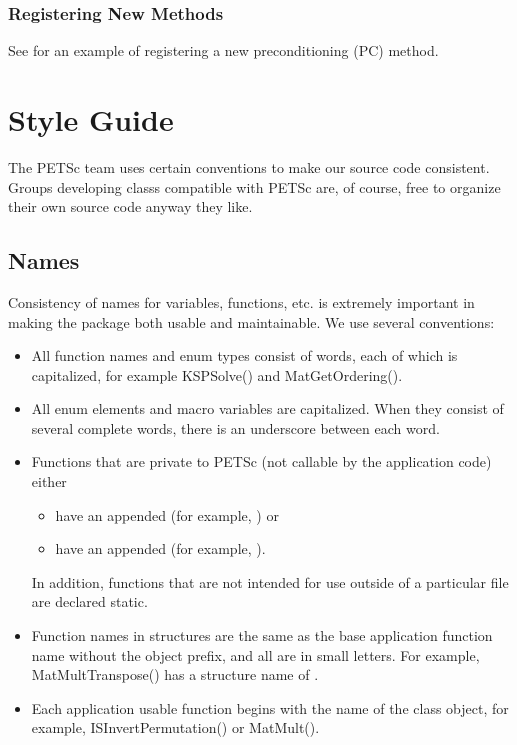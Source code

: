 \documentclass[twoside,12pt]{../sty/report_petsc}
\begin{document}
\subsection{Registering New Methods}
\label{sec:registeringnewmethods}

See  for an example of registering a new
preconditioning (PC) method.


\chapter{Style Guide}

The PETSc team uses certain conventions to make our source code consistent. Groups
developing classs compatible with PETSc are, of course, free to organize their
own source code anyway they like.

\section{Names}
Consistency of names for variables, functions, etc. is extremely 
important in making the package both usable and maintainable.
We use several conventions:
\begin{itemize}
\item All function names and enum types consist of words, each of 
      which is capitalized, for example KSPSolve() and 
      MatGetOrdering().
\item All enum elements and macro variables are capitalized. When
      they consist of several complete words, there is an underscore between each word.
\item Functions that are private to PETSc (not callable by the 
      application code) either
      \begin{itemize}
        \item have an appended  (for example, 
           ) or
        \item have an appended  (for example,
           ).
      \end{itemize}

      In addition, functions that are not intended for use outside
      of a particular file are declared static.
\item Function names in structures are the same as the base application
      function name without the object prefix, and all are in small letters. 
      For example, MatMultTranspose() has a structure name of 
      .
\item Each application usable function begins with the name of the class object, 
      for example, ISInvertPermutation() or MatMult(). 
\end{itemize}
\end{document}
